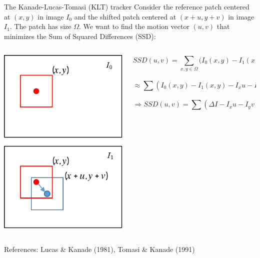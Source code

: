 \begin{frame}{The Kanade-Lucas-Tomasi (KLT) tracker}
  Consider the reference patch centered at $(x,y)$ in image $I_0$ and the shifted patch centered at $(x+u, y+v)$ in image $I_1$.  
  The patch has size $\Omega$. We want to find the motion vector $(u,v)$ that minimizes the Sum of Squared Differences (SSD):
  
  \begin{columns}
    \begin{column}{0.2\textwidth}
      \begin{center}
        \includegraphics[width=\columnwidth]{./images/optical_flow/klt_tracking.pdf}
      \end{center}
    \end{column}
    \begin{column}{0.7\textwidth}  %
      \[
      SSD(u,v) = \sum_{x,y \in \Omega} \big(I_0(x,y) - I_1(x+u, y+v)\big)^2
      \]

      \[
      \approx \sum ( I_0(x,y) - I_1(x,y) - I_x u - I_y v )^2
      \]

      \[
      \Rightarrow SSD(u,v) = \sum ( \Delta I - I_x u - I_y v )^2
      \]
    \end{column}
  \end{columns}
  References:  
  Lucas \& Kanade (1981), Tomasi \& Kanade (1991)
\end{frame}

